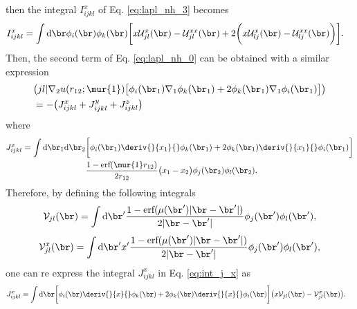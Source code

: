 then the integral $I_{ijkl}^x $ of Eq. \eqref{eq:lapl_nh_3} becomes 
\begin{equation}
 \label{eq:int_i_x}
 \begin{aligned}
 &I_{ijkl}^x = \int \text{d}\br \phi_i(\br) \phi_k(\br) \bigg[ x \mathcal{U}_{jl}^x(\br) - \mathcal{U}_{jl}^{xx}(\br) + 2 \bigg(x \mathcal{U}_{lj}^x(\br) - \mathcal{U}_{lj}^{xx}(\br) \bigg)\bigg].
 \end{aligned}
\end{equation}
Then, the second term of Eq. \eqref{eq:lapl_nh_0} can be obtained with a similar expression
\begin{equation}
 \begin{aligned}
 & \big(jl|\nabla_2u(r_{12};\mur{1}) \big[ \phi_i(\br_1)\nabla_1 \phi_k(\br_1) + 2 \phi_k(\br_1) \nabla_1 \phi_i(\br_1)\big] \big) \\
 &=-\big( J_{ijkl}^x + J_{ijkl}^y + J_{ijkl}^z \big)
 \end{aligned}
\end{equation}
where 
\begin{equation}
 \begin{aligned}
 \label{eq:int_j_x}
  J_{ijkl}^x = \int \text{d}\br_1 \text{d}\br_2 & \bigg[ \phi_i(\br_1)\deriv{}{x_1}{} \phi_k(\br_1) + 2 \phi_k(\br_1) \deriv{}{x_1}{} \phi_i(\br_1)\bigg] \\  
 & \frac{1 - \text{erf}(\mur{1} r_{12})}{2 r_{12}} \big(x_1 - x_2 \big) \phi_j(\br_2) \phi_l(\br_2).
 \end{aligned}
\end{equation}
Therefore, by defining the following integrals 
\begin{equation}
 \label{eq:u_jl}
 \mathcal{V}_{jl}(\br) = \int \text{d}\br' \frac{1 - \text{erf}(\mu (\br') |\br - \br'|)}{2 |\br - \br'|} \phi_j(\br') \phi_l(\br'),
\end{equation}
\begin{equation}
 \label{eq:ux_jl}
 \mathcal{V}_{jl}^{x}(\br) = \int \text{d}\br' x' \frac{1 - \text{erf}(\mu (\br') |\br - \br'|)}{2 |\br - \br'|} \phi_j(\br') \phi_l(\br'),
\end{equation}
one can re express the integral $J_{ijkl}^x$ in Eq. \eqref{eq:int_j_x} as 
\begin{equation}
 \begin{aligned}
& J_{ijkl}^x = \int \text{d}\br \bigg[ \phi_i(\br)\deriv{}{x}{} \phi_k(\br) + 2 \phi_k(\br) \deriv{}{x}{} \phi_i(\br)\bigg]  \big( x \mathcal{V}_{jl}(\br) -  \mathcal{V}_{jl}^{x}(\br) \big).
 \end{aligned}
\end{equation}

